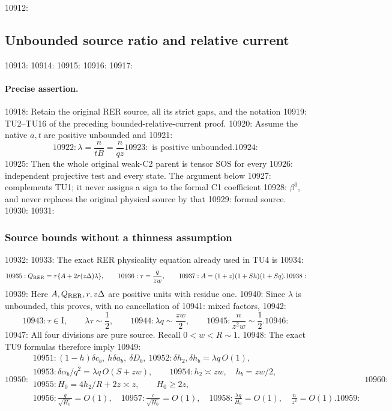 10912: \subsection{Unbounded source ratio and relative current}
10913: \label{component:pef021eabacde}
10914: 
10915: \label{pef021eabacde:sec:r2-unbounded-current-new}
10916: 
10917: \paragraph{Precise assertion.}
10918: Retain the original RER source, all its strict gaps, and the notation
10919: TU2--TU16 of the preceding bounded-relative-current proof.
10920: Assume the native $a,t$ are positive unbounded and
10921: \[
10922:              \lambda=\frac{n}{tB}=\frac{n}{qz}
10923:                    \text{ is positive unbounded}.                 \tag{UL1}
10924: \]
10925: Then the whole original weak-C2 parent is tensor SOS for every
10926: independent projective test and every state. The argument below
10927: complements TU1; it never assigns a sign to the formal C1 coefficient
10928: $\beta^0$, and never replaces the original physical source by that
10929: formal source.
10930: 
10931: \subsubsection*{Source bounds without a thinness assumption}
10932: 
10933: The exact RER physicality equation already used in TU4 is
10934: \[
10935:  Q_{\rm RER}=\tau\{A+2r(z\Delta)\lambda\},\qquad
10936:  \tau=\frac q{zw},\qquad
10937:  A=(1+z)(1+Sh)(1+Sq).
10938: \]
10939: Here $A,Q_{\rm RER},r,z\Delta$ are positive units with residue one.
10940: Since $\lambda$ is unbounded, this proves, with no cancellation of
10941: mixed factors,
10942: \[
10943:  \tau\in\mathrm I,\qquad \lambda\tau\sim\frac12,\qquad
10944:  \lambda q\sim\frac{zw}{2},\qquad
10945:  \frac n{z^2w}\sim\frac12.                                     \tag{UL2}
10946: \]
10947: All four divisions are pure source. Recall $0<w<R\sim1$.
10948: The exact TU9 formulas therefore imply
10949: \[
10950: \begin{gathered}
10951:  (1-h)\delta c_b,\ h\delta a_b,\ \delta D_b,\
10952:             \delta h_2,\delta h_b=\lambda q\,O(1),\\
10953:  \delta\alpha_b/q^2=\lambda q\,O(S+zw),\qquad
10954:  h_2\asymp zw,\quad h_b=zw/2,\\
10955:  H_0=4h_2/R+2z\asymp z,\qquad H_0\geq2z,\\
10956:  \frac g{\sqrt{H_0}}=O(1),\quad
10957:  \frac c{\sqrt{H_0}}=O(1),\quad
10958:  \frac{\lambda q}{H_0}=O(1),\quad \frac n{z^2}=O(1).
10959: \end{gathered}                                                   \tag{UL3}
10960: \]
